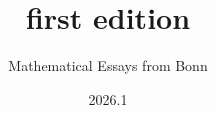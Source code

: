 \documentclass[12pt, a4paper, oneside]{scrartcl}
\title{first edition}
\author{Mathematical Essays from Bonn}
\date{2026.1}
\begin{document}

{
  \setlength{\topskip}{20pt}
  \renewcommand{\contentsname}{Essays}
  \tableofcontents
}

\begin{refsection}
    
\end{refsection}

\begin{refsection}
    
\end{refsection}




\end{document}
